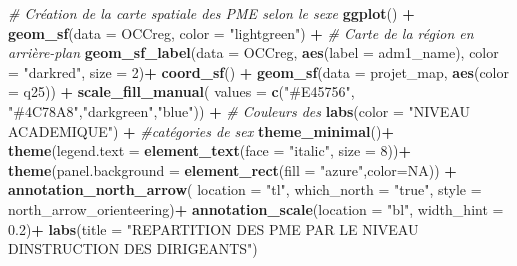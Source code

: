 \documentclass[
]{article}
\newenvironment{Shaded}{\begin{snugshade}}{\end{snugshade}}
\newcommand{\AttributeTok}[1]{\textcolor[rgb]{0.13,0.29,0.53}{#1}}
\newcommand{\CommentTok}[1]{\textcolor[rgb]{0.56,0.35,0.01}{\textit{#1}}}
\newcommand{\ConstantTok}[1]{\textcolor[rgb]{0.56,0.35,0.01}{#1}}
\newcommand{\DecValTok}[1]{\textcolor[rgb]{0.00,0.00,0.81}{#1}}
\newcommand{\FloatTok}[1]{\textcolor[rgb]{0.00,0.00,0.81}{#1}}
\newcommand{\FunctionTok}[1]{\textcolor[rgb]{0.13,0.29,0.53}{\textbf{#1}}}
\newcommand{\NormalTok}[1]{#1}
\newcommand{\SpecialCharTok}[1]{\textcolor[rgb]{0.81,0.36,0.00}{\textbf{#1}}}
\newcommand{\StringTok}[1]{\textcolor[rgb]{0.31,0.60,0.02}{#1}}
\begin{document}
\begin{Shaded}
\begin{Highlighting}[]
\CommentTok{\# Création de la carte spatiale des PME selon le sexe}
\FunctionTok{ggplot}\NormalTok{() }\SpecialCharTok{+}
  \FunctionTok{geom\_sf}\NormalTok{(}\AttributeTok{data =}\NormalTok{ OCCreg, }\AttributeTok{color =} \StringTok{"lightgreen"}\NormalTok{) }\SpecialCharTok{+}  \CommentTok{\# Carte de la région en arrière{-}plan}
  \FunctionTok{geom\_sf\_label}\NormalTok{(}\AttributeTok{data =}\NormalTok{ OCCreg, }\FunctionTok{aes}\NormalTok{(}\AttributeTok{label =}\NormalTok{ adm1\_name), }\AttributeTok{color =} \StringTok{"darkred"}\NormalTok{, }\AttributeTok{size =} \DecValTok{2}\NormalTok{)}\SpecialCharTok{+}
  \FunctionTok{coord\_sf}\NormalTok{() }\SpecialCharTok{+}
  \FunctionTok{geom\_sf}\NormalTok{(}\AttributeTok{data =}\NormalTok{ projet\_map, }\FunctionTok{aes}\NormalTok{(}\AttributeTok{color =}\NormalTok{ q25)) }\SpecialCharTok{+}
  \FunctionTok{scale\_fill\_manual}\NormalTok{(}
    \AttributeTok{values =} \FunctionTok{c}\NormalTok{(}\StringTok{"\#E45756"}\NormalTok{, }\StringTok{"\#4C78A8"}\NormalTok{,}\StringTok{"darkgreen"}\NormalTok{,}\StringTok{"blue"}\NormalTok{)) }\SpecialCharTok{+}  \CommentTok{\# Couleurs des  }
  \FunctionTok{labs}\NormalTok{(}\AttributeTok{color =} \StringTok{"NIVEAU ACADEMIQUE"}\NormalTok{) }\SpecialCharTok{+}                       \CommentTok{\#catégories de sex}
  \FunctionTok{theme\_minimal}\NormalTok{()}\SpecialCharTok{+}
  \FunctionTok{theme}\NormalTok{(}\AttributeTok{legend.text =} \FunctionTok{element\_text}\NormalTok{(}\AttributeTok{face =} \StringTok{"italic"}\NormalTok{, }\AttributeTok{size =} \DecValTok{8}\NormalTok{))}\SpecialCharTok{+}
  \FunctionTok{theme}\NormalTok{(}\AttributeTok{panel.background =} \FunctionTok{element\_rect}\NormalTok{(}\AttributeTok{fill =} \StringTok{"azure"}\NormalTok{,}\AttributeTok{color=}\ConstantTok{NA}\NormalTok{)) }\SpecialCharTok{+}
  \FunctionTok{annotation\_north\_arrow}\NormalTok{(}
    \AttributeTok{location =} \StringTok{"tl"}\NormalTok{, }\AttributeTok{which\_north =} \StringTok{"true"}\NormalTok{, }\AttributeTok{style =}\NormalTok{ north\_arrow\_orienteering)}\SpecialCharTok{+}
  \FunctionTok{annotation\_scale}\NormalTok{(}\AttributeTok{location =} \StringTok{"bl"}\NormalTok{, }\AttributeTok{width\_hint =} \FloatTok{0.2}\NormalTok{)}\SpecialCharTok{+}
  \FunctionTok{labs}\NormalTok{(}\AttributeTok{title =} \StringTok{"REPARTITION DES PME PAR LE NIVEAU D\textquotesingle{}INSTRUCTION DES DIRIGEANTS"}\NormalTok{)}
\end{Highlighting}
\end{Shaded}
\end{document}
